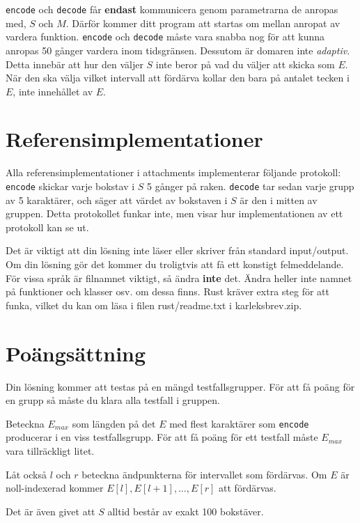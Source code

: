 \texttt{encode} och \texttt{decode} får \textbf{endast} kommunicera genom parametrarna de anropas med, $S$ och $M$.
Därför kommer ditt program att startas om mellan anropat av vardera funktion. \texttt{encode} och \texttt{decode} 
måste vara snabba nog för att kunna anropas 50 gånger vardera inom tidsgränsen. Dessutom är domaren inte
\textit{adaptiv}. Detta innebär att hur den väljer $S$ inte beror på vad du väljer att skicka som $E$. När den ska
välja vilket intervall att fördärva kollar den bara på antalet tecken i $E$, inte innehållet av $E$.

\section*{Referensimplementationer}
Alla referensimplementationer i attachments implementerar följande protokoll: \texttt{encode} skickar varje bokstav
i $S$ 5 gånger på raken. \texttt{decode} tar sedan varje grupp av 5 karaktärer, och säger att värdet av bokstaven
i $S$ är den i mitten av gruppen. Detta protokollet funkar inte, men visar hur implementationen av ett
protokoll kan se ut.

Det är viktigt att din lösning inte läser eller skriver från standard input/output. Om din lösning gör det
kommer du troligtvis att få ett konstigt felmeddelande. För vissa språk är filnamnet viktigt, så ändra \textbf{inte}
det. Ändra heller inte namnet på funktioner och klasser osv. om dessa finns. Rust kräver extra steg för att funka,
vilket du kan om läsa i filen rust/readme.txt i karleksbrev.zip.

\section*{Poängsättning}
Din lösning kommer att testas på en mängd testfallsgrupper.
För att få poäng för en grupp så måste du klara alla testfall i gruppen.

Beteckna $E_{max}$ som längden på det $E$ med flest karaktärer som \texttt{encode} producerar
i en viss testfallsgrupp. För att få poäng för ett testfall måste $E_{max}$ vara tillräckligt litet.

Låt också $l$ och $r$ beteckna ändpunkterna för intervallet som fördärvas. Om $E$ är noll-indexerad kommer
$E[l],E[l+1],\dots,E[r]$ att fördärvas.

Det är även givet att $S$ alltid består av exakt 100 bokstäver.

